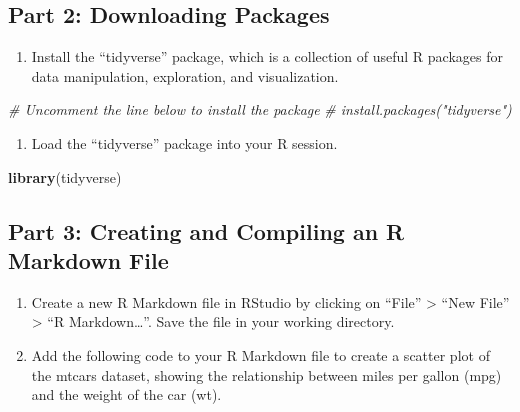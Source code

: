 \documentclass[
]{book}
\newenvironment{Shaded}{\begin{snugshade}}{\end{snugshade}}
\newcommand{\CommentTok}[1]{\textcolor[rgb]{0.56,0.35,0.01}{\textit{#1}}}
\newcommand{\FunctionTok}[1]{\textcolor[rgb]{0.13,0.29,0.53}{\textbf{#1}}}
\newcommand{\NormalTok}[1]{#1}
\providecommand{\tightlist}{%
  \setlength{\itemsep}{0pt}\setlength{\parskip}{0pt}}
\begin{document}
\hypertarget{part-2-downloading-packages}{%
\subsection{Part 2: Downloading Packages}\label{part-2-downloading-packages}}

\begin{enumerate}
\def\labelenumi{\arabic{enumi}.}
\tightlist
\item
  Install the ``tidyverse'' package, which is a collection of useful R packages for data manipulation, exploration, and visualization.
\end{enumerate}

\begin{Shaded}
\begin{Highlighting}[]
\CommentTok{\# Uncomment the line below to install the package}
\CommentTok{\# install.packages("tidyverse")}
\end{Highlighting}
\end{Shaded}

\begin{enumerate}
\def\labelenumi{\arabic{enumi}.}
\setcounter{enumi}{1}
\tightlist
\item
  Load the ``tidyverse'' package into your R session.
\end{enumerate}

\begin{Shaded}
\begin{Highlighting}[]
\FunctionTok{library}\NormalTok{(tidyverse)}
\end{Highlighting}
\end{Shaded}

\hypertarget{part-3-creating-and-compiling-an-r-markdown-file}{%
\subsection{Part 3: Creating and Compiling an R Markdown File}\label{part-3-creating-and-compiling-an-r-markdown-file}}

\begin{enumerate}
\def\labelenumi{\arabic{enumi}.}
\item
  Create a new R Markdown file in RStudio by clicking on ``File'' \textgreater{} ``New File'' \textgreater{} ``R Markdown\ldots{}''. Save the file in your working directory.
\item
  Add the following code to your R Markdown file to create a scatter plot of the mtcars dataset, showing the relationship between miles per gallon (mpg) and the weight of the car (wt).
\end{enumerate}
\end{document}
